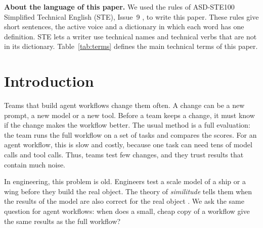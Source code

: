 \begin{note}
\textbf{About the language of this paper.} We used the rules of ASD-STE100 Simplified
Technical English (STE), Issue~9 \citep{asdste100}, to write this paper. These rules give short
sentences, the active voice and a dictionary in which each word has one definition. STE lets a
writer use technical names and technical verbs that are not in its dictionary.
Table~\ref{tab:terms} defines the main technical terms of this paper.
\end{note}

\section{Introduction}
\label{sec:intro}

Teams that build agent workflows change them often. A change can be a new prompt, a new model or a
new tool. Before a team keeps a change, it must know if the change makes the workflow better. The
usual method is a full evaluation: the team runs the full workflow on a set of tasks and compares
the scores. For an agent workflow, this is slow and costly, because one task can need tens of model
calls and tool calls. Thus, teams test few changes, and they trust results that contain much noise.

In engineering, this problem is old. Engineers test a scale model of a ship or a wing before they
build the real object. The theory of \emph{similitude} tells them when the results of the model are
also correct for the real object \citep{buckingham1914physically}. We ask the same question for
agent workflows: when does a small, cheap copy of a workflow give the same results as the full
workflow?

